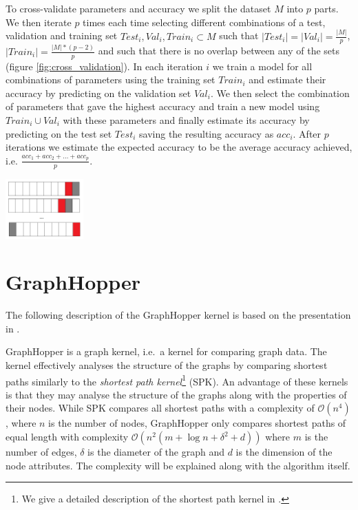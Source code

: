 \documentclass{article}
\begin{document}
\begin{minipage}{0.7\linewidth}
	To cross-validate parameters and accuracy we split the dataset $M$ into $p$ parts. We then iterate $p$ times each time selecting different combinations of a test, validation and training set $Test_i, Val_i, Train_i\subset M$ such that $|Test_i|=|Val_i|=\frac{|M|}{p}$,  $|Train_i| = \frac{|M| * (p-2)}{p}$ and such that there is no overlap between any of the sets (figure \ref{fig:cross_validation}). In each iteration $i$ we train a model for all combinations of parameters using the training set $Train_i$ and estimate their accuracy by predicting on the validation set $Val_i$. We then select the combination of parameters that gave the highest accuracy and train a new model using $Train_i\cup Val_i$ with these parameters and finally estimate its accuracy by predicting on the test set $Test_i$ saving the resulting accuracy as $acc_i$. After $p$ iterations we estimate the expected accuracy to be the average accuracy achieved, i.e. $\frac{acc_1 + acc_2 + ... + acc_p}{p}$.
\end{minipage}
\hspace{0.5cm}
\begin{minipage}[c]{0.3\linewidth}
	\centering
		\includegraphics[width=3cm]{10-fold-cross-validation_3}
		\label{fig:cross_validation}
\end{minipage}

\section{GraphHopper}
\label{section:graphhopper}
The following description of the GraphHopper kernel is based on the presentation in \cite{graphhopper}.

GraphHopper is a graph kernel, i.e.\ a kernel for comparing graph data. The kernel effectively analyses the structure of the graphs by comparing shortest paths similarly to the \textit{shortest path kernel}\footnote{We give a detailed description of the shortest path kernel in \cite{svm-graph-kernels}.} (SPK)\cite{shortest-path}. An advantage of these kernels is that they may analyse the structure of the graphs along with the properties of their nodes.
While SPK compares all shortest paths with a complexity of $\mathcal{O}(n^4)$, where $n$ is the number of nodes, GraphHopper only compares shortest paths of equal length with complexity $\mathcal{O}(n^2(m+\log n+\delta^2 + d))$ where $m$ is the number of edges, $\delta$ is the diameter of the graph and $d$ is the dimension of the node attributes. The complexity will be explained along with the algorithm itself.
\end{document}

